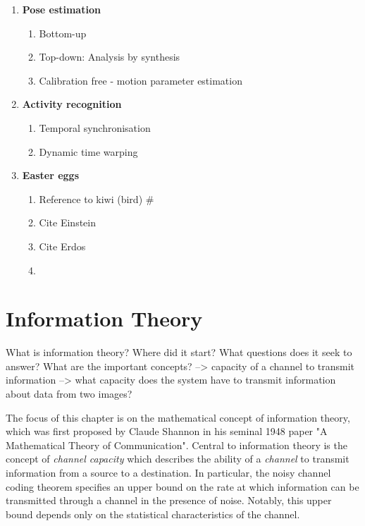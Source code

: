 \begin{enumerate}
\item{\textbf{Pose estimation}}
  \begin{enumerate}
    \item{Bottom-up}
    \item{Top-down: Analysis by synthesis}
    \item{Calibration free - motion parameter estimation}
  \end{enumerate}

\item{\textbf{Activity recognition}}
  \begin{enumerate}
    \item{Temporal synchronisation}
    \item{Dynamic time warping}
  \end{enumerate}

\item{\textbf{Easter eggs}}
\begin{enumerate}
  \item {Reference to kiwi (bird) \#}
  \item {Cite Einstein}
  \item {Cite Erdos}
  \item {}
\end{enumerate}


\end{enumerate}





\section{Information Theory}



What is information theory? Where did it start? What questions does it seek to answer? What are the important concepts?
--> capacity of a channel to transmit information
--> what capacity does the system have to transmit information about data from two images?

The focus of this chapter is on the mathematical concept of information theory, which was first proposed by Claude Shannon in his seminal 1948 paper "A Mathematical Theory of Communication". Central to information theory is the concept of \textit{channel capacity} which describes the ability of a \textit{channel} to transmit information from a source to a destination. In particular, the noisy channel coding theorem specifies an upper bound on the rate at which information can be transmitted through a channel in the presence of noise. Notably, this upper bound depends only on the statistical characteristics of the channel. 

